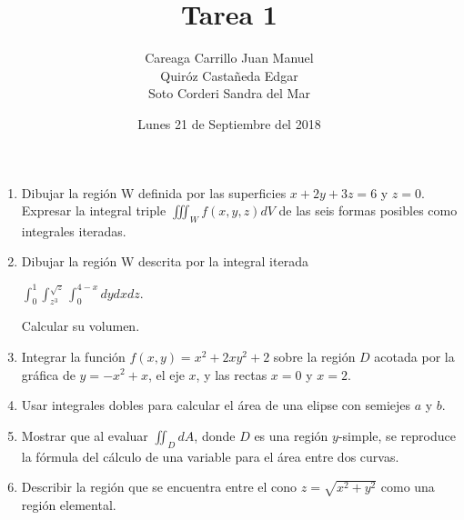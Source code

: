 \documentclass{article}
\begin{document}
\title{Tarea 1}
        \author{Careaga Carrillo Juan Manuel \\ Quiróz Castañeda Edgar \\ Soto Corderi Sandra del Mar}
        \date{Lunes 21 de Septiembre del 2018}
        \maketitle

	\begin{enumerate}
   	\item {
   Dibujar la región W definida por las superficies $x + 2y + 3z = 6$ y $z = 0$. Expresar la integral triple $\iiint_Wf(x,y,z)dV$ de las seis formas posibles como integrales iteradas.\\

	}

   \item {
    Dibujar la región W descrita por la integral iterada
    \begin{center}
    $\int_{0}^{1}\int_{z^3}^{\sqrt{z}}\int_{0}^{4-x}dydxdz$. 
    \end{center}
    Calcular su volumen.\\
		     
	}


   \item {
    Integrar la función $f(x,y) = x^2 + 2xy^2 + 2$ sobre la región $D$ acotada por la gráfica de $y = -x^2 + x$, el eje $x$, y las rectas $x = 0$ y $x = 2$.\\


	}

   \item {
   Usar integrales dobles para calcular el área de una elipse con semiejes $a$ y $b$.\\

	}

   \item {
   Mostrar que al evaluar $\iint_DdA$, donde $D$ es una región $y$-simple, se reproduce la fórmula del cálculo de una variable para el área entre dos curvas.\\

	

    }

   \item {
   Describir la región que se encuentra entre el cono $z = \sqrt{x^2 + y^2}$ como una región elemental.\\

}
\end{enumerate}
\end{document}
